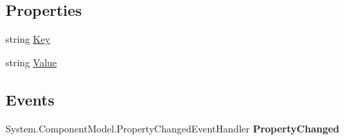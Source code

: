 \subsection*{Properties}
\begin{DoxyCompactItemize}
\item 
\hypertarget{class_price___comparison_1_1amazon_1_1ecs_1_1_cart_create_request_item_meta_data_a4aada8631f2741d3571a9c1279a32e7d}{string \hyperlink{class_price___comparison_1_1amazon_1_1ecs_1_1_cart_create_request_item_meta_data_a4aada8631f2741d3571a9c1279a32e7d}{Key}}\label{class_price___comparison_1_1amazon_1_1ecs_1_1_cart_create_request_item_meta_data_a4aada8631f2741d3571a9c1279a32e7d}

\begin{DoxyCompactList}\small\item\em \end{DoxyCompactList}\item 
\hypertarget{class_price___comparison_1_1amazon_1_1ecs_1_1_cart_create_request_item_meta_data_a26088b712d02601c029776a5ff836f58}{string \hyperlink{class_price___comparison_1_1amazon_1_1ecs_1_1_cart_create_request_item_meta_data_a26088b712d02601c029776a5ff836f58}{Value}}\label{class_price___comparison_1_1amazon_1_1ecs_1_1_cart_create_request_item_meta_data_a26088b712d02601c029776a5ff836f58}

\begin{DoxyCompactList}\small\item\em \end{DoxyCompactList}\end{DoxyCompactItemize}
\subsection*{Events}
\begin{DoxyCompactItemize}
\item 
\hypertarget{class_price___comparison_1_1amazon_1_1ecs_1_1_cart_create_request_item_meta_data_afebd3710d70b85fcc4cc2e20053350c9}{System.\-Component\-Model.\-Property\-Changed\-Event\-Handler {\bfseries Property\-Changed}}\label{class_price___comparison_1_1amazon_1_1ecs_1_1_cart_create_request_item_meta_data_afebd3710d70b85fcc4cc2e20053350c9}

\end{DoxyCompactItemize}
